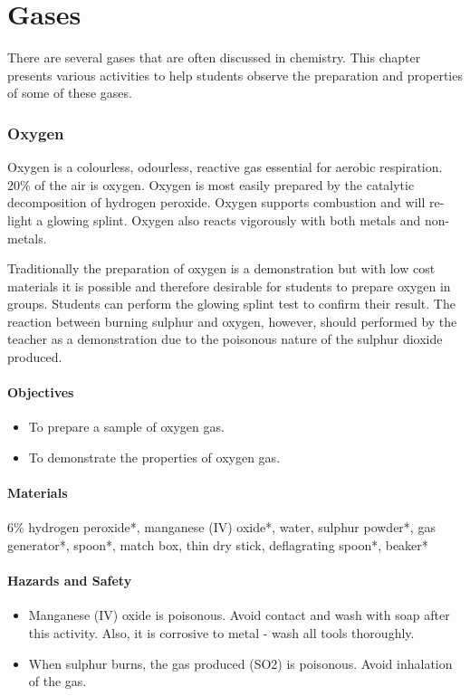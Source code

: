 \chapter{Gases}

There are several gases that are often discussed in chemistry. This chapter presents various activities to help students observe the preparation and properties of some of these gases.

\subsection{Oxygen}

Oxygen is a colourless, odourless, reactive gas essential for aerobic respiration. 20\% of the air is oxygen. Oxygen is most easily prepared by the catalytic decomposition of hydrogen peroxide. Oxygen supports combustion and will re-light a glowing splint. Oxygen also reacts vigorously with both metals and non-metals.

Traditionally the preparation of oxygen is a demonstration but with low cost materials it is possible and therefore desirable for students to prepare oxygen in groups. Students can perform the glowing splint test to confirm their result. The reaction between burning sulphur and oxygen, however, should performed by the teacher as a demonstration due to the poisonous nature of the sulphur dioxide produced.

\subsubsection*{Objectives}
\begin{itemize}
\item{To prepare a sample of oxygen gas.}
\item{To demonstrate the properties of oxygen gas.}
\end{itemize}

\subsubsection*{Materials}
6\% hydrogen peroxide*, manganese (IV) oxide*, water, sulphur powder*, gas generator*, spoon*, match box, thin dry stick, deflagrating spoon*, beaker*

\subsubsection*{Hazards and Safety}
\begin{itemize}
\item{Manganese (IV) oxide is poisonous. Avoid contact and wash with soap after this activity. Also, it is corrosive to metal - wash all tools thoroughly.}
\item{When sulphur burns, the gas produced (SO2) is poisonous. Avoid inhalation of the gas.}
\end{itemize}


